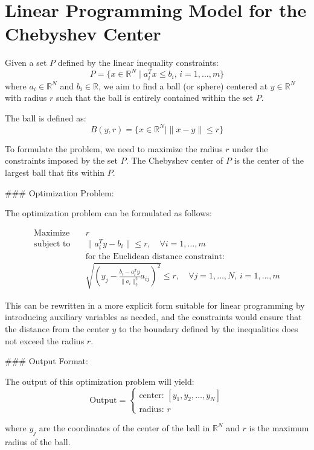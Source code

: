 \documentclass{article}
\begin{document}
\section*{Linear Programming Model for the Chebyshev Center}

Given a set \( P \) defined by the linear inequality constraints:
\[
P = \{ x \in \mathbb{R}^N \mid a_i^T x \leq b_i, \, i = 1, \ldots, m \}
\]
where \( a_i \in \mathbb{R}^N \) and \( b_i \in \mathbb{R} \), we aim to find a ball (or sphere) centered at \( y \in \mathbb{R}^N \) with radius \( r \) such that the ball is entirely contained within the set \( P \).

The ball is defined as:
\[
B(y, r) = \{ x \in \mathbb{R}^N \mid \| x - y \| \leq r \}
\]

To formulate the problem, we need to maximize the radius \( r \) under the constraints imposed by the set \( P \). The Chebyshev center of \( P \) is the center of the largest ball that fits within \( P \).

### Optimization Problem:

The optimization problem can be formulated as follows:

\[
\begin{align*}
\text{Maximize} \quad & r \\
\text{subject to} \quad & \| a_i^T y - b_i \| \leq r, \quad \forall i = 1, \ldots, m \\
& \text{for the Euclidean distance constraint: } \\
& \sqrt{(y_j - \frac{b_i - a_i^T y}{\|a_i\|_2^2} a_{ij})^2} \leq r, \quad \forall j = 1, \ldots, N, \, i = 1, \ldots, m
\end{align*}
\]

This can be rewritten in a more explicit form suitable for linear programming by introducing auxiliary variables as needed, and the constraints would ensure that the distance from the center \( y \) to the boundary defined by the inequalities does not exceed the radius \( r \).

### Output Format:

The output of this optimization problem will yield:
\[
\text{Output} =
\begin{cases}
\text{center: } [y_1, y_2, \ldots, y_N] \\
\text{radius: } r
\end{cases}
\]

where \( y_j \) are the coordinates of the center of the ball in \( \mathbb{R}^N \) and \( r \) is the maximum radius of the ball.
\end{document}
